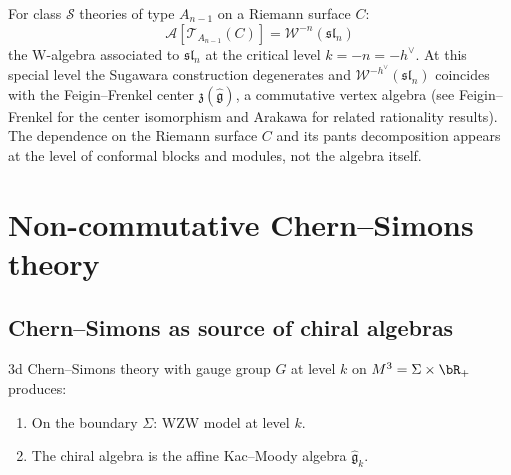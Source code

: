 \begin{example}
For class $\mathcal{S}$ theories of type $A_{n-1}$ on a Riemann surface $C$:
\[
\mathcal{A}[\mathcal{T}_{A_{n-1}}(C)] = \mathcal{W}^{-n}(\mathfrak{sl}_n)
\]
the W-algebra associated to $\mathfrak{sl}_n$ at the critical level $k = -n = -h^\vee$. At this special level the Sugawara construction degenerates and $\mathcal{W}^{-h^\vee}(\mathfrak{sl}_n)$ coincides with the Feigin--Frenkel center $\mathfrak{z}(\widehat{\mathfrak{g}})$, a commutative vertex algebra (see Feigin--Frenkel \cite{FF} for the center isomorphism and Arakawa \cite{Ara15} for related rationality results). The dependence on the Riemann surface $C$ and its pants decomposition appears at the level of conformal blocks and modules, not the algebra itself.
\end{example}


\section{Non-commutative Chern--Simons theory}
\subsection{Chern--Simons as source of chiral algebras}

\begin{construction}
3d Chern--Simons theory with gauge group $G$ at level $k$ on $M^3 = \Sigma \times \bR_+$
produces:
\begin{enumerate}[label=(\roman*)]
\item On the boundary $\Sigma$: WZW model at level $k$.
\item The chiral algebra is the affine Kac--Moody algebra $\hat{\mathfrak{g}}_k$.
\end{enumerate}
\end{construction}


